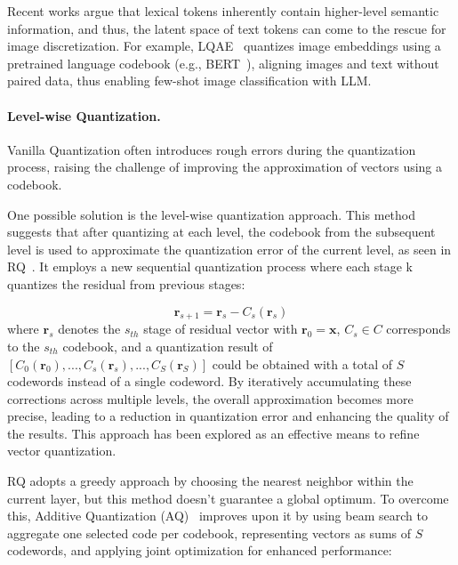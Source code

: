 Recent works argue that lexical tokens inherently contain higher-level semantic information, and thus, the latent space of text tokens can come to the rescue for image discretization.
For example, LQAE~\cite{liu2024lqae} quantizes image embeddings using a pretrained language codebook (e.g., BERT~\cite{devlin2018bert}), aligning images and text without paired data, thus enabling few-shot image classification with LLM.

\paragraph{Level-wise Quantization.}
Vanilla Quantization often introduces rough errors during the quantization process, raising the challenge of improving the approximation of vectors using a codebook. 

One possible solution is the level-wise quantization approach.
This method suggests that after quantizing at each level, the codebook from the subsequent level is used to approximate the quantization error of the current level, as seen in RQ~\cite{juang1982multiple}. 
It employs a new sequential quantization process where each stage k quantizes the residual from previous stages:


\begin{equation}\label{equ:rvq}
\boldsymbol{r}_{s+1} = \boldsymbol{r}_{s} - C_s(\boldsymbol{r}_s)
\end{equation}
where $\boldsymbol{r}_s$ denotes the $s_{th}$ stage of residual vector with $\boldsymbol{r}_0=\boldsymbol{x}$, $C_s \in C$ corresponds to the $s_{th}$ codebook, and a quantization result of $[C_0(\boldsymbol{r}_0), ..., C_s(\boldsymbol{r}_s), ..., C_S(\boldsymbol{r}_S)]$ could be obtained with a total of $S$ codewords instead of a single codeword. 
By iteratively accumulating these corrections across multiple levels, the overall approximation becomes more precise, leading to a reduction in quantization error and enhancing the quality of the results. This approach has been explored as an effective means to refine vector quantization.


RQ adopts a greedy approach by choosing the nearest neighbor within the current layer, but this method doesn't guarantee a global optimum. To overcome this, Additive Quantization (AQ)~\cite{babenko2014additive} improves upon it by using beam search to aggregate one selected code per codebook, representing vectors as sums of $S$ codewords, and applying joint optimization for enhanced performance:

